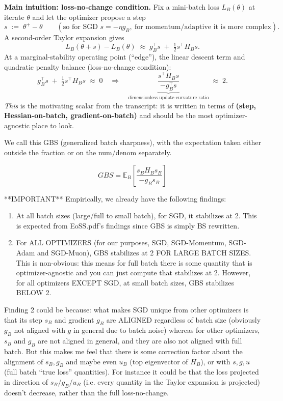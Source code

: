 \documentclass{article}
\begin{document}
\textbf{Main intuition: loss-no-change condition.}
Fix a mini-batch loss $L_B(\theta)$ at iterate $\theta$ and let the optimizer propose a step
\[
s \;:=\; \theta^+ - \theta
\qquad(\text{so for SGD } s=-\eta g_B,\ \text{for momentum/adaptive it is more complex}).
\]
A second-order Taylor expansion gives
\[
L_B(\theta+s)-L_B(\theta)\;\approx\; g_B^\top s \;+\;\tfrac12 s^\top H_B s.
\]
At a marginal-stability operating point (``edge''), the linear descent term and quadratic penalty balance (loss-no-change condition):
\[
g_B^\top s \;+\;\tfrac12 s^\top H_B s \;\approx\; 0
\quad\Longrightarrow\quad
\underbrace{\frac{s^\top H_B s}{-g_B^\top s}}_{\text{dimensionless update-curvature ratio}}\;\approx\; 2.
\]
\emph{This} is the motivating scalar from the transcript: it is written in terms of \textbf{(step, Hessian-on-batch, gradient-on-batch)} and should be the most optimizer-agnostic place to look.

We call this GBS (generalized batch sharpness), with the expectation taken either outside the fraction or on the num/denom separately.

$$
GBS = \mathbb{E}_B\left[\frac{s_B H_Bs_B}{-g_Bs_B}\right]
$$

**IMPORTANT** Empirically, we already have the following findings:
\begin{enumerate}
    \item At all batch sizes (large/full to small batch), for SGD, it stabilizes at 2. This is expected from EoSS.pdf's findings since GBS is simply BS rewritten.
    \item For ALL OPTIMIZERS (for our purposes, SGD, SGD-Momentum, SGD-Adam and SGD-Muon), GBS stabilizes at 2 FOR LARGE BATCH SIZES. This is non-obvious: this means for full batch there is some quantity that is optimizer-agnostic and you can just compute that stabilizes at 2. However, for all optimizers EXCEPT SGD, at small batch sizes, GBS stabilizes BELOW 2.
\end{enumerate}

Finding 2 could be because: what makes SGD unique from other optimizers is that its step $s_B$ and gradient $g_B$ are ALIGNED regardless of batch size (obviously $g_B$ not aligned with $g$ in general due to batch noise) whereas for other optimizers, $s_B$ and $g_B$ are not aligned in general, and they are also not aligned with full batch. But this makes me feel that there is some correction factor about the alignment of $s_B, g_B$ and maybe even $u_B$ (top eigenvector of $H_B$), or with $s,g,u$ (full batch ``true loss'' quantities). For instance it could be that the loss projected in direction of $s_B/g_B/u_B$ (i.e. every quantity in the Taylor expansion is projected) doesn't decrease, rather than the full loss-no-change. 
\end{document}
